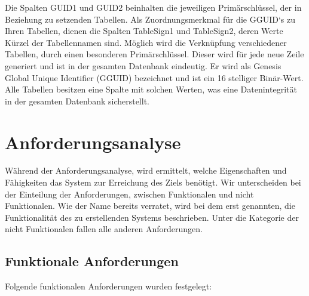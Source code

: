 Die Spalten GUID1 und GUID2 beinhalten die jeweiligen Primärschlüssel, der in Beziehung zu setzenden Tabellen. Als Zuordnungsmerkmal für die GGUID`s zu Ihren Tabellen, dienen die Spalten TableSign1 und TableSign2, deren Werte Kürzel der Tabellennamen sind. Möglich wird die Verknüpfung verschiedener Tabellen, durch einen besonderen Primärschlüssel. Dieser wird für jede neue Zeile generiert und ist in der gesamten Datenbank eindeutig. Er wird als Genesis Global Unique Identifier (GGUID) bezeichnet und ist ein 16 stelliger Binär-Wert. Alle Tabellen besitzen eine Spalte mit solchen Werten, was eine Datenintegrität in der gesamten Datenbank sicherstellt.

\section{Anforderungsanalyse}
\label{ch:Systemanalyse:sec:Anforderungsanalyse}

Während der Anforderungsanalyse, wird ermittelt, welche Eigenschaften und Fähigkeiten das System zur Erreichung des Ziels benötigt. Wir unterscheiden bei der Einteilung der Anforderungen, zwischen Funktionalen und nicht Funktionalen. Wie der Name bereits verratet, wird bei dem erst genannten, die Funktionalität des zu erstellenden Systems beschrieben. Unter die Kategorie der nicht Funktionalen fallen alle anderen Anforderungen. 

\subsection{Funktionale Anforderungen}

Folgende funktionalen Anforderungen wurden festgelegt:

